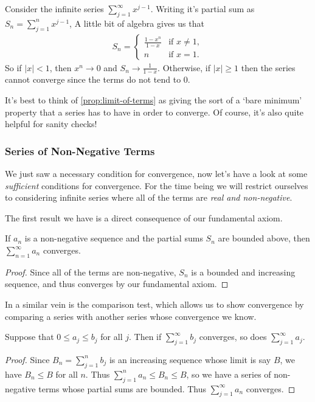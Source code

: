 \begin{example}
		Consider the infinite series $\sum_{j = 1}^{\infty} x^{j - 1}$. Writing it's partial sum as
	$S_n = \sum_{j = 1}^{n} x^{j-1}$,
	A little bit of algebra gives us that
	\begin{align*}
		S_n = \begin{cases}
        \frac{1 - x^n}{1 - x} &\mbox{if } x \neq 1, \\
        n &\mbox{if } x = 1.
       \end{cases}
	\end{align*}
	So if $|x| < 1$, then $x^n \rightarrow 0$ and $S_n \rightarrow \frac{1}{1 - x}$. Otherwise, if $|x| \geq 1$ then the series cannot converge since the terms do not tend to 0.
\end{example}

It's best to think of \autoref{prop:limit-of-terms} as giving the sort of a `bare minimum' property that a series has to have in order to converge. Of course, it's also quite helpful for sanity checks!

\subsubsection{Series of Non-Negative Terms}

We just saw a necessary condition for convergence, now let's have a look at some \emph{sufficient} conditions for convergence. For the time being we will restrict ourselves to considering infinite series where all of the terms are \emph{real and non-negative}.

The first result we have is a direct consequence of our fundamental axiom.

\begin{theorem}
	If $a_n$ is a non-negative sequence and the partial sums $S_n$ are bounded above, then $\sum_{n = 1}^{\infty} a_n$ converges.
\end{theorem}
\begin{proof}
	Since all of the terms are non-negative, $S_n$ is a bounded and increasing sequence, and thus converges by our fundamental axiom.
\end{proof}

In a similar vein is the comparison test, which allows us to show convergence by comparing a series with another series whose convergence we know.

\begin{theorem}
	Suppose that $0 \leq a_j \leq b_j$ for all $j$. Then if $\sum_{j = 1}^{\infty} b_j$ converges, so does $\sum_{j = 1}^{\infty} a_j$.
\end{theorem}
\begin{proof}
	Since $B_n = \sum_{j = 1}^n b_j$ is an increasing sequence whose limit is say $B$, we have $B_n \leq B$ for all $n$. 
	Thus $\sum_{j = 1}^n a_n \leq B_n \leq B$, so we have a series of non-negative terms whose partial sums are bounded. Thus $\sum_{j = 1}^\infty a_n$ converges.
\end{proof}

